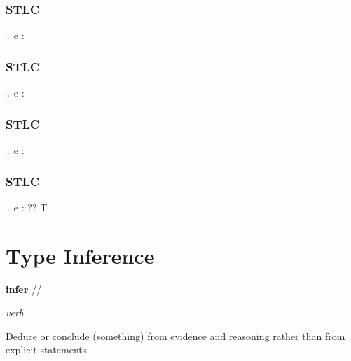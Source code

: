 \documentclass{beamer}
\newcommand{\lam}[2]{\lambda {#1} \texttt{.} \; {#2}}
\begin{document}
\begin{frame}
  \frametitle{STLC}

    {\Gamma \vdash \lam{x}{e} \;\; : \phantom{ \;\; ? \rightarrow T }}

\end{frame}

\begin{frame}
  \frametitle{STLC}

    {\Gamma \vdash \lam{x}{e} \;\; : \phantom{ \;\; ? \rightarrow T }}

\end{frame}

\begin{frame}
  \frametitle{STLC}

    {\Gamma \vdash \lam{x}{e} \;\; : \phantom{ \;\; ? \rightarrow T }}

\end{frame}

\begin{frame}
  \frametitle{STLC}


    {\Gamma \vdash \lam{x}{e} \;\; : \;\;\; ?? \rightarrow T}

\end{frame}

\section{Type Inference}

\begin{frame}


  \textbf{infer} // %

  \textit{verb}

  \bigskip

  Deduce or conclude (something) from evidence and reasoning rather than from explicit statements.

\end{frame}
\end{document}
